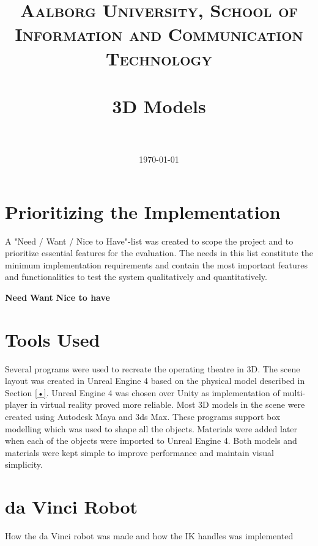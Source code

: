 \documentclass[paper=a4, fontsize=11pt]{scrartcl} %
\title{	
\normalfont \normalsize 
\textsc{Aalborg University, School of Information and Communication Technology} \\ [25pt] %
\horrule{0.5pt} \\[0.4cm] %
\huge 3D Models \\ %
\horrule{2pt} \\[0.5cm] %
}
\date{\normalsize\today} %
\numberwithin{equation}{section} %
\numberwithin{figure}{section} %
\numberwithin{table}{section} %
\begin{document}
\maketitle %
\section{Prioritizing the Implementation}

A "Need / Want / Nice to Have"-list was created to scope the project and to prioritize essential features for the evaluation. The needs in this list constitute the minimum implementation requirements and contain the most important features and functionalities to test the system qualitatively and quantitatively. 

\textbf{Need}
\textbf{Want}
\textbf{Nice to have}
 

\section{Tools Used}
Several programs were used to recreate the operating theatre in 3D. The scene layout was created in Unreal Engine 4 based on the physical model described in Section \ref{•}. Unreal Engine 4 was chosen over Unity as implementation of multi-player in virtual reality proved more reliable. 
Most 3D models in the scene were created using Autodesk Maya and 3ds Max. These programs support box modelling which was used to shape all the objects. 
Materials were added later when each of the objects were imported to Unreal Engine 4. Both models and materials were kept simple to improve performance and maintain visual simplicity.


\section{da Vinci Robot}

How the da Vinci robot was made and how the IK handles was implemented
\end{document}
